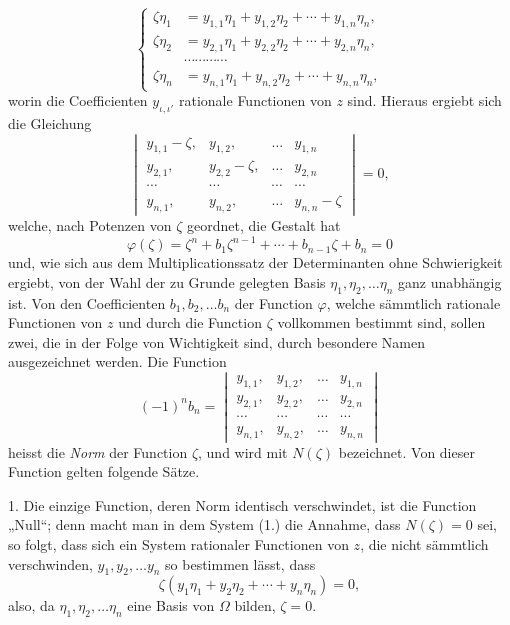 \documentclass{article}
\begin{document}
\[ \left\{ \begin{aligned} \zeta\eta_{1} &= y_{1,1}\eta_{1} + y_{1,2}\eta_{2} + \cdots + y_{1,n}\eta_{n}, \\ \zeta\eta_{2} &= y_{2,1}\eta_{1} + y_{2,2}\eta_{2} + \cdots + y_{2,n}\eta_{n}, \\ &\cdots\cdots\cdots\cdots \\ \zeta\eta_{n} &= y_{n,1}\eta_{1} + y_{n,2}\eta_{2} + \cdots + y_{n,n}\eta_{n}, \end{aligned} \right. \tag{1.} \]
worin die Coefficienten $y_{\iota,\iota'}$ rationale Functionen von $z$ sind. Hieraus ergiebt sich die Gleichung
\[ \begin{vmatrix} y_{1,1}-\zeta, & y_{1,2}, & \ldots & y_{1,n} \\ y_{2,1}, & y_{2,2}-\zeta, & \ldots & y_{2,n} \\ \cdots & \cdots & \cdots & \cdots \\ y_{n,1}, & y_{n,2}, & \ldots & y_{n,n}-\zeta \end{vmatrix} = 0, \tag{2.} \]
welche, nach Potenzen von $\zeta$ geordnet, die Gestalt hat
\[ \varphi(\zeta) = \zeta^{n} + b_{1}\zeta^{n-1} + \cdots + b_{n-1}\zeta + b_{n} = 0 \tag{3.} \]
und, wie sich aus dem Multiplicationssatz der Determinanten ohne Schwierigkeit ergiebt, von der Wahl der zu Grunde gelegten Basis $\eta_{1}, \eta_{2}, \ldots \eta_{n}$ ganz unabhängig ist. Von den Coefficienten $b_{1}, b_{2}, \ldots b_{n}$ der Function $\varphi$, welche sämmtlich rationale Functionen von $z$ und durch die Function $\zeta$ vollkommen bestimmt sind, sollen zwei, die in der Folge von Wichtigkeit sind, durch besondere Namen ausgezeichnet werden. Die Function
\[ (-1)^{n}b_{n} = \begin{vmatrix} y_{1,1}, & y_{1,2}, & \ldots & y_{1,n} \\ y_{2,1}, & y_{2,2}, & \ldots & y_{2,n} \\ \cdots & \cdots & \cdots & \cdots \\ y_{n,1}, & y_{n,2}, & \ldots & y_{n,n} \end{vmatrix} \tag{4.} \]
heisst die \emph{Norm} der Function $\zeta$, und wird mit $N(\zeta)$ bezeichnet. Von dieser Function gelten folgende Sätze.

1. Die einzige Function, deren Norm identisch verschwindet, ist die Function „Null“; denn macht man in dem System (1.) die Annahme, dass $N(\zeta) = 0$ sei, so folgt, dass sich ein System rationaler Functionen von $z$, die nicht sämmtlich verschwinden, $y_{1}, y_{2}, \ldots y_{n}$ so bestimmen lässt, dass
\[ \zeta(y_{1}\eta_{1} + y_{2}\eta_{2} + \cdots + y_{n}\eta_{n}) = 0, \]
also, da $\eta_{1}, \eta_{2}, \ldots \eta_{n}$ eine Basis von $\Omega$ bilden, $\zeta = 0$.
\end{document}
